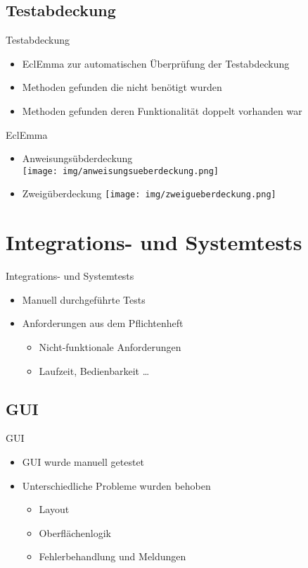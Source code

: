 \documentclass[18pt]{beamer}
\begin{document}
\subsection{Testabdeckung}
\begin{frame}{Testabdeckung}
\begin{itemize}
	\item EclEmma zur automatischen Überprüfung der Testabdeckung
	\item Methoden gefunden die nicht benötigt wurden
	\item Methoden gefunden deren Funktionalität doppelt vorhanden war
\end{itemize}
\end{frame}

\begin{frame}{EclEmma}
\begin{itemize}
	\item Anweisungsübderdeckung\\
	\texttt{[image: img/anweisungsueberdeckung.png]}
	\item Zweigüberdeckung
	\texttt{[image: img/zweigueberdeckung.png]}
\end{itemize}
\end{frame}


\section{Integrations- und Systemtests}
\begin{frame}{Integrations- und Systemtests}
\begin{itemize}
	\item Manuell durchgeführte Tests
	\item Anforderungen aus dem Pflichtenheft
	\begin{itemize}
		\item Nicht-funktionale Anforderungen
		\item Laufzeit, Bedienbarkeit \dots
	\end{itemize}
\end{itemize}
\end{frame}

\subsection{GUI}
\begin{frame}{GUI}
\begin{itemize}
	\item GUI wurde manuell getestet
	\item Unterschiedliche Probleme wurden behoben
	\begin{itemize}
		\item Layout
		\item Oberflächenlogik
		\item Fehlerbehandlung und Meldungen
	\end{itemize}
\end{itemize}
\end{frame}
\end{document}
